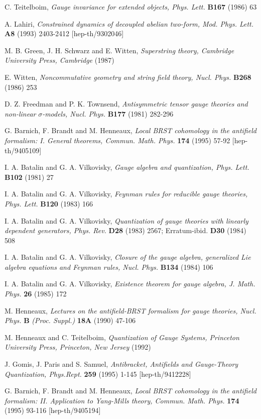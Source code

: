 \documentclass[a4paper,12pt]{article}
\begin{document}
\begin{thebibliography}{99}
  C. Teitelboim, \textit{Gauge invariance for extended
objects, Phys. Lett.} \textbf{B167} (1986) 63

  A. Lahiri, \textit{Constrained dynamics of decoupled
abelian two-form, Mod. Phys. Lett.} \textbf{A8} (1993) 2403-2412
[hep-th/9302046]

  M. B. Green, J. H. Schwarz and E. Witten, \textit{%
Superstring theory, Cambridge University Press, Cambridge} (1987)

  E. Witten, \textit{Noncommutative geometry and string
field theory, Nucl. Phys.} \textbf{B268} (1986) 253

  D. Z. Freedman and P. K. Townsend, \textit{Antisymmetric
tensor gauge theories and non-linear }$\sigma $\textit{-models, Nucl. Phys.} 
\textbf{B177} (1981) 282-296

  G. Barnich, F. Brandt and M. Henneaux, \textit{Local BRST
cohomology in the antifield formalism: I. General theorems, Commun. Math.
Phys.} \textbf{174} (1995) 57-92 [hep-th/9405109]

  I. A. Batalin and G. A. Vilkovisky, \textit{Gauge algebra
and quantization, Phys. Lett.} \textbf{B102} (1981) 27

  I. A. Batalin and G. A. Vilkovisky, \textit{Feynman rules
for reducible gauge theories, Phys. Lett.} \textbf{B120} (1983) 166

  I. A. Batalin and G. A. Vilkovisky, \textit{Quantization of
gauge theories with linearly dependent generators, Phys. Rev.} \textbf{D28}
(1983) 2567; Erratum-ibid. \textbf{D30} (1984) 508

  I. A. Batalin and G. A. Vilkovisky, \textit{Closure of the
gauge algebra, generalized Lie algebra equations and Feynman rules, Nucl.
Phys.} \textbf{B134} (1984) 106

  I. A. Batalin and G. A. Vilkovisky, \textit{Existence
theorem for gauge algebra, J. Math. Phys.} \textbf{26} (1985) 172

  M. Henneaux, \textit{Lectures on the antifield-BRST
formalism for gauge theories, Nucl. Phys.} \textbf{B} \textit{(Proc. Suppl.)}
\textbf{18A} (1990) 47-106

  M. Henneaux and C. Teitelboim, \textit{Quantization of
Gauge Systems, Princeton University Press, Princeton, New Jersey} (1992)

  J. Gomis, J. Paris and S. Samuel, \textit{Antibracket,
Antifields and Gauge-Theory Quantization, Phys.Rept.} \textbf{259} (1995)
1-145 [hep-th/9412228]

  G. Barnich, F. Brandt and M. Henneaux, \textit{Local BRST
cohomology in the antifield formalism: II. Application to Yang-Mills theory,
Commun. Math. Phys.} \textbf{174} (1995) 93-116 [hep-th/9405194]
\end{thebibliography}
\end{document}
